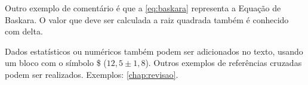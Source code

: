     Outro exemplo de comentário é que a \cref{eq:baskara} representa a Equação de Baskara. O valor que deve ser calculada a raiz quadrada também é conhecido com delta.
    

Dados estatísticos ou numéricos também podem ser adicionados no texto, usando um bloco com o símbolo \$ ($12,5 \pm 1,8$). Outros exemplos de referências cruzadas podem ser realizados. Exemplos: \cref{chap:revisao}.